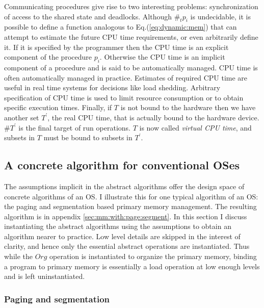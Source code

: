 \documentclass[draft]{article}
\begin{document}
Communicating  procedures  give  rise  to  two  interesting  problems:
synchronization of access to the shared state and deadlocks.  Although
$\#_tp_i$  is  undecidable,  it  is  possible  to  define  a  function
analogous  to Eq.(\ref{eq:dynamic:mem}) that  can attempt  to estimate
the future CPU  time requirements, or even arbitrarily  define it.  If
it is  specified by the  programmer then the  CPU time is  an explicit
component  of the  procedure  $p_i$.   Otherwise the  CPU  time is  an
implicit  component of  a procedure  and is  said to  be automatically
managed.   CPU  time  is  often  automatically  managed  in  practice.
Estimates of  required CPU  time are useful  in real time  systems for
decisions like load shedding.   Arbitrary specification of CPU time is
used  to limit resource  consumption or  to obtain  specific execution
times.  Finally,  if $T$  is not  bound to the  hardware then  we have
another set $T^\prime$,  the real CPU time, that  is actually bound to
the  hardware  device.   $\#T^\prime$  is  the  final  target  of  run
operations.  $T$ is now called \emph{virtual CPU time}, and subsets in
$T$ must be bound to subsets in $T^\prime$.

\subsection{A concrete algorithm for conventional OSes}
\label{sec:concrete:algos}

The assumptions  implicit in the abstract algorithms  offer the design
space  of concrete algorithms  of an  OS.  I  illustrate this  for one
typical algorithm of an OS:  the paging and segmentation based primary
memory   management.    The  resulting   algorithm   is  in   appendix
\ref{sec:mm:with:page:segment}.     In   this   section    I   discuss
instantiating the abstract algorithms  using the assumptions to obtain
an algorithm nearer to practice.  Low level details are skipped in the
interest of clarity, and  hence only the essential abstract operations
are instantiated.   Thus while the $Org$ operation  is instantiated to
organize the  primary memory, binding  a program to primary  memory is
essentially  a  load  operation  at  low enough  levels  and  is  left
uninstantiated.

\subsubsection{Paging and segmentation}
\label{sec:concrete:paging:seg}
\end{document}
